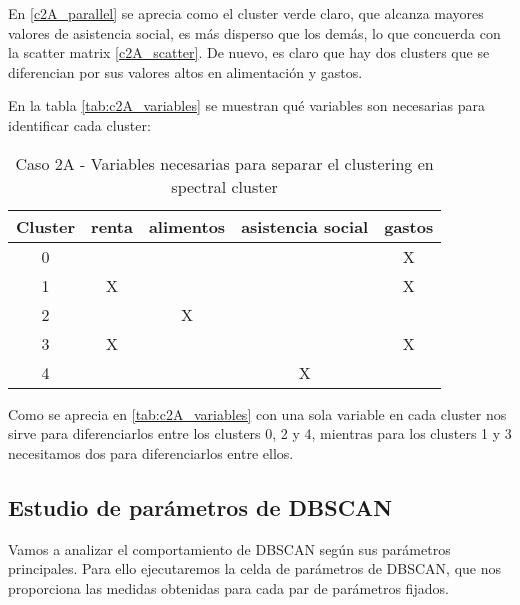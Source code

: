 En \eqref{c2A_parallel} se aprecia como el cluster verde claro, que alcanza mayores valores de asistencia social, es más disperso que los demás, lo que concuerda con la scatter matrix \eqref{c2A_scatter}. De nuevo, es claro que hay dos clusters que se diferencian por sus valores altos en alimentación y gastos.

En la tabla  \eqref{tab:c2A_variables} se muestran qué variables son necesarias para identificar cada cluster:

\begin{table}[H]
\centering
\caption{Caso 2A - Variables necesarias para separar el clustering en spectral cluster}
\label{tab:c2A_variables}
\begin{tabular}{ccccc}
\toprule
 Cluster & renta & alimentos & asistencia social & gastos \\
\midrule
0 & & & & X \\
1 & X & & & X \\
2 & & X & & \\
3 & X & & & X \\
4 & & & X & \\
\bottomrule
\end{tabular}
\end{table}
Como se aprecia en \eqref{tab:c2A_variables} con una sola variable en cada cluster nos sirve para diferenciarlos entre los clusters 0, 2 y 4, mientras para los clusters 1 y 3 necesitamos dos para diferenciarlos entre ellos.

\subsection{Estudio de parámetros de DBSCAN}

Vamos a analizar el comportamiento de DBSCAN según sus parámetros principales. Para ello ejecutaremos la celda de parámetros de DBSCAN, que nos proporciona las medidas obtenidas para cada par de parámetros fijados.

